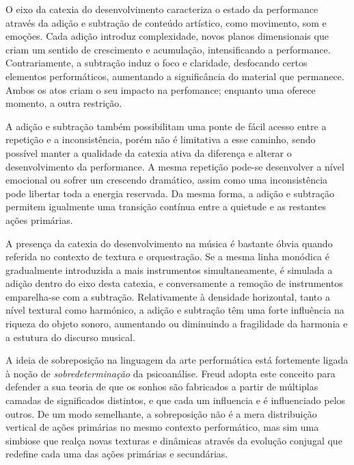 \documentclass[../main.tex]{subfiles}
\begin{document}

O eixo da catexia do desenvolvimento caracteriza o estado da performance através da adição e subtração de conteúdo artístico, como movimento, som e emoções. Cada adição introduz complexidade, novos planos dimensionais que criam um sentido de crescimento e acumulação, intensificando a performance. Contrariamente, a subtração induz o foco e claridade, desfocando certos elementos performáticos, aumentando a significância do material que permanece. Ambos os atos criam o seu impacto na perfomance; enquanto uma oferece momento, a outra restrição.

A adição e subtração também possibilitam uma ponte de fácil acesso entre a repetição e a inconsistência, porém não é limitativa a esse caminho, sendo possível manter a qualidade da catexia ativa da diferença e alterar o desenvolvimento da performance. A mesma repetição pode-se desenvolver a nível emocional ou sofrer um crescendo dramático, assim como uma inconsistência pode libertar toda a energia reservada. Da mesma forma, a adição e subtração permitem igualmente uma transição contínua entre a quietude e as restantes ações primárias.

A presença da catexia do desenvolvimento na música é bastante óbvia quando referida no contexto de textura e orquestração. Se a mesma linha monódica é gradualmente introduzida a mais instrumentos simultaneamente, é simulada a adição dentro do eixo desta catexia, e conversamente a remoção de instrumentos emparelha-se com a subtração. Relativamente à densidade horizontal, tanto a nível textural como harmónico, a adição e subtração têm uma forte influência na riqueza do objeto sonoro, aumentando ou diminuindo a fragilidade da harmonia e a estutura do discurso musical.


A ideia de sobreposição na linguagem da arte performática está fortemente ligada à noção de \textsl{sobredeterminação} da psicoanálise. Freud adopta este conceito para defender a sua teoria de que os sonhos são fabricados a partir de múltiplas camadas de significados distintos, e que cada um influencia e é influenciado pelos outros\cite{claudia}. De um modo semelhante, a sobreposição não é a mera distribuição vertical de ações primárias no mesmo contexto performático, mas sim uma simbiose que realça novas texturas e dinâmicas através da evolução conjugal que redefine cada uma das ações primárias e secundárias.
\end{document}
